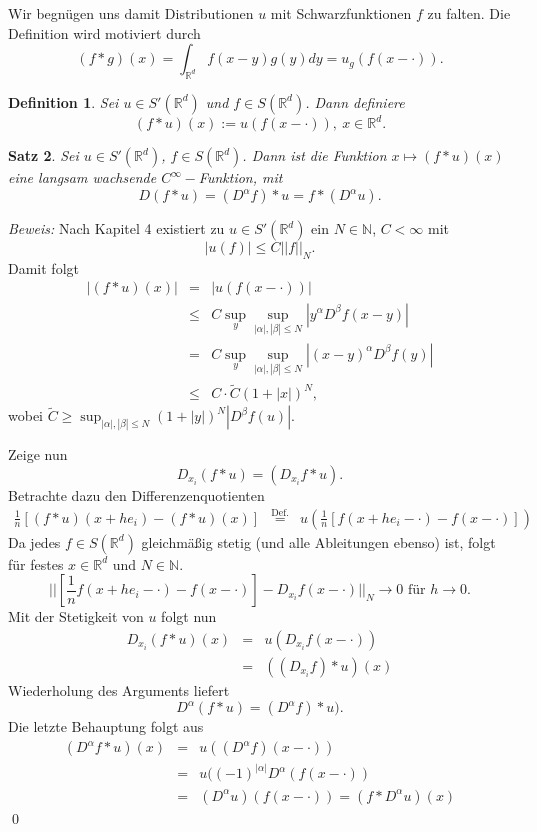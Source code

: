 \documentclass[12pt]{extreport} %
\newtheorem{Satz}{Satz}[subsection]
\newtheorem{Definition}[Satz]{Definition}
\numberwithin{equation}{section}
\newcommand{\R}{\mathbb{R}} %
\newcommand{\N}{\mathbb{N}} %
\newcommand{\m}{\cdot}
\newcommand{\Bew}{\emph{Beweis: }}
\begin{document}
	Wir begnügen uns damit Distributionen $u$ mit Schwarzfunktionen $f$ zu falten. Die Definition wird motiviert durch
	$$(f*g)(x)=\int_{\R^d}f(x-y)g(y) dy = u_g(f(x-\m)).$$
	
	\begin{Definition}
		Sei $u\in S'(\R^d)$ und $f\in S(\R^d)$. Dann definiere
		$$(f*u)(x):= u(f(x-\m)),~ x\in \R^d.$$
	\end{Definition}
	
	\begin{Satz}
		Sei $u\in S'(\R^d)$, $f\in S(\R^d)$. Dann ist die Funktion $x\mapsto (f*u)(x)$ eine langsam wachsende $C^\infty-$Funktion, mit 
		$$D(f*u) = (D^\alpha f)*u = f*(D^\alpha u).$$
	\end{Satz}
	
	\Bew Nach Kapitel 4 existiert zu $u\in S'(\R^d)$ ein $N\in \N$, $C<\infty$ mit 
	$$|u(f)|\leq C||f||_N.$$
	Damit folgt
	\begin{eqnarray}
		|(f*u)(x)| &=& |u(f(x-\m))|\nonumber\\
		&\leq& C\sup_y \sup_{|\alpha|,|\beta|\leq N}|y^\alpha D^\beta f(x-y)|\nonumber\\
		&=& C\sup_y\sup_{|\alpha|,|\beta|\leq N} |(x-y)^\alpha D^\beta f(y)|\nonumber\\
		&\leq& C\m \tilde{C}(1+|x|)^N, \nonumber
	\end{eqnarray}
	wobei $\tilde{C}\geq \sup_{|\alpha|,|\beta|\leq N}(1+|y|)^N|D^\beta f(u)|$.
	
	Zeige nun
	$$D_{x_i}(f*u) = (D_{x_i}f*u).$$
	Betrachte dazu den Differenzenquotienten
	\begin{eqnarray}
		\frac{1}{n}[(f*u)(x+h e_i)-(f*u)(x)] &\overset{\text{Def.}}{=}& u(\frac{1}{n}[f(x+he_i -\m)-f(x-\m)])\nonumber
	\end{eqnarray}
	Da jedes $f\in S(\R^d)$ gleichmäßig stetig (und alle Ableitungen ebenso) ist, folgt für festes $x\in \R^d$ und $N\in \N$.
	$$||[\frac{1}{n}f(x+he_i-\m)-f(x-\m)]-D_{x_i}f(x-\m)||_N\rightarrow 0\text{ für } h\rightarrow 0.$$
	Mit der Stetigkeit von $u$ folgt nun
	\begin{eqnarray}
		D_{x_i}(f*u)(x) &=& u(D_{x_i}f(x-\m))\nonumber\\
		&=& ((D_{x_i}f)*u)(x)\nonumber
	\end{eqnarray}
	Wiederholung des Arguments liefert
	$$D^\alpha (f*u) = (D^\alpha f)*u).$$
	Die letzte Behauptung folgt aus 
	\begin{eqnarray}
		(D^\alpha f*u)(x) &=& u((D^\alpha f)(x-\m))\nonumber\\
		&=& u((-1)^{|\alpha|}D^\alpha (f(x-\m))\nonumber\\
		&=& (D^\alpha u)(f(x-\m)) = (f*D^\alpha u)(x)\nonumber
	\end{eqnarray}
	\qed
	
\end{document}
